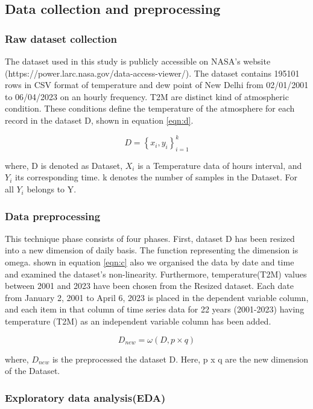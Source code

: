 \documentclass[sn-mathphys,Numbered]{sn-jnl}
\theoremstyle{thmstyleone}
\theoremstyle{thmstyletwo}
\theoremstyle{thmstylethree}
\begin{document}
\subsection{Data collection and preprocessing}
\subsubsection{Raw dataset collection}
The dataset used in this study is publicly accessible on NASA's website (https://power.larc.nasa.gov/data-access-viewer/). The dataset contains 195101 rows in CSV format of temperature and dew point of New Delhi from 02/01/2001 to 06/04/2023 on an hourly frequency. T2M are distinct kind of atmospheric condition. These conditions define the temperature of the atmosphere for each record in the dataset D, shown in equation \ref{eqn:d}.

\begin{equation}
\label{eqn:d}
D=\left \{ x_i, y_i \right \}_{i=1}^{k}
\end{equation}

where, D is denoted as Dataset, \(X_i\) is a Temperature data of hours interval, and \(Y_i\) its corresponding time. k denotes the number of samples in the Dataset. For all \(Y_i\) belongs to Y.

\subsubsection{Data preprocessing}
This technique phase consists of four phases. First, dataset D has been resized into a new dimension of daily basis. The function representing the dimension is omega. shown in equation \ref{eqn:c} also we organised the data by date and time and examined the dataset's non-linearity. Furthermore, temperature(T2M) values between 2001 and 2023 have been chosen from the Resized dataset. Each date from January 2, 2001 to April 6, 2023 is placed in the dependent variable column, and each item in that column of time series data for 22 years (2001-2023) having temperature (T2M) as an independent variable column has been added.

\begin{equation}
\label{eqn:c}
D_{new}=\omega \left ( D, p  \times q \right )
\end{equation}

where, \(D_{new}\) is the preprocessed the dataset D. Here,  p x q  are the new dimension of the Dataset.
\subsubsection{Exploratory data analysis(EDA)}
\end{document}
